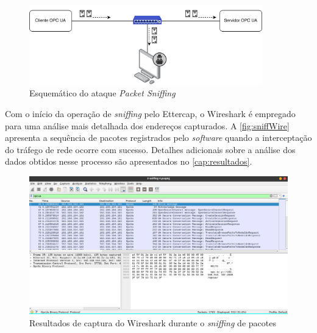         \begin{figure}[htbp]
            \caption{\label{fig:sniffing}Esquemático do ataque \textit{Packet Sniffing}}
            \begin{center}
                \includegraphics[width=0.9\textwidth]{USPSC-img/sniffing.png}
            \end{center}
        \end{figure}
        
        Com o início da operação de \textit{sniffing} pelo Ettercap, o Wireshark é empregado para uma análise mais detalhada dos endereços capturados. A \autoref{fig:sniffWire} apresenta a sequência de pacotes registrados pelo \textit{software} quando a interceptação do tráfego de rede ocorre com sucesso. Detalhes adicionais sobre a análise dos dados obtidos nesse processo são apresentados no \autoref{cap:resultados}.

        \begin{figure}[htbp]
            \caption{\label{fig:sniffWire}Resultados de captura do Wireshark durante o \textit{sniffing} de pacotes}
            \begin{center}
                \includegraphics[width=1\textwidth]{USPSC-img/sniffWire.png}
            \end{center}
        \end{figure}
    
